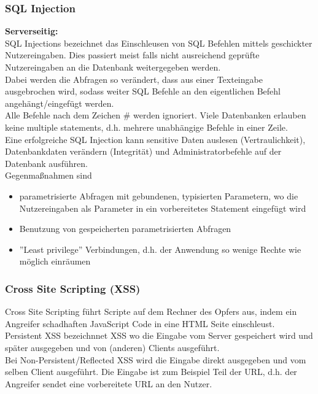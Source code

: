 \documentclass[a4paper,12pt,leqno]{article}
\begin{document}
\subsubsection{SQL Injection}

\textbf{Serverseitig:}\\
SQL Injections bezeichnet das Einschleusen von SQL Befehlen mittels geschickter Nutzereingaben. Dies passiert meist falls nicht ausreichend geprüfte Nutzereingaben an die Datenbank weitergegeben werden.\\

Dabei werden die Abfragen so verändert, dass aus einer Texteingabe ausgebrochen wird, sodass weiter SQL Befehle an den eigentlichen Befehl angehängt/eingefügt werden.\\
Alle Befehle nach dem Zeichen \# werden ignoriert. Viele Datenbanken erlauben keine multiple statements, d.h. mehrere unabhängige Befehle in einer Zeile.\\

Eine erfolgreiche SQL Injection kann sensitive Daten auslesen (Vertraulichkeit), Datenbankdaten verändern (Integrität) und Administratorbefehle auf der Datenbank ausführen.\\
Gegenmaßnahmen sind 
\begin{itemize}
\item parametrisierte Abfragen mit gebundenen, typisierten Parametern, wo die Nutzereingaben als Parameter in ein vorbereitetes Statement eingefügt wird
\item Benutzung von gespeicherten parametrisierten Abfragen
\item ''Least privilege'' Verbindungen, d.h. der Anwendung so wenige Rechte wie möglich einräumen
\end{itemize}

\subsubsection{Cross Site Scripting (XSS)}

Cross Site Scripting führt Scripte auf dem Rechner des Opfers aus, indem ein Angreifer schadhaften JavaScript Code in eine HTML Seite einschleust.\\

Persistent XSS bezeichnnet XSS wo die Eingabe vom Server gespeichert wird und später ausgegeben und von (anderen) Clients ausgeführt.\\

Bei Non-Persistent/Reflected XSS wird die Eingabe direkt ausgegeben und vom selben Client ausgeführt. Die Eingabe ist zum Beispiel Teil der URL, d.h. der Angreifer sendet eine vorbereitete URL an den Nutzer.
\end{document}
